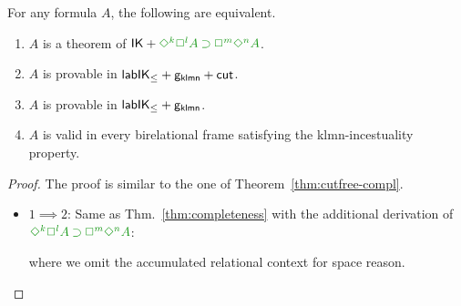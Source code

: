 \documentclass[a4paper]{article}
\begin{document}
\begin{theorem}\label{thm:cutfree-compl-gklmn}
	For any formula $A$, the following are equivalent.
	\begin{enumerate}
		\item\label{1} $A$ is a theorem of $\IK + \fm{\DIA^k\BOX^l A \IMP \BOX^m\DIA^n A}$. 
		\item\label{2} $A$ is provable in $\mathsf{lab}\mathsf{IK}_{\le} + {\mathsf{g_{klmn}}} +\mathsf{cut}_{}$.
		\item\label{3} $A$ is provable in $\mathsf{lab}\mathsf{IK}_{\le} + {\mathsf{g_{klmn}}} $.
		\item\label{4} $A$ is valid in every birelational frame satisfying the klmn-incestuality property.
	\end{enumerate}
\end{theorem}

\begin{proof} 
	The proof is similar to the one of Theorem~\ref{thm:cutfree-compl}.
	\begin{itemize}
		\item $1 \implies 2$:
		Same as Thm.~\ref{thm:completeness} with the additional derivation of $\fm{\DIA^k\BOX^l A \IMP \BOX^m\DIA^n A}$:
		\begin{smallequation*}
		\end{smallequation*}
		where we omit the accumulated relational context for space reason.
		

\end{itemize}
\end{proof}
\end{document}
